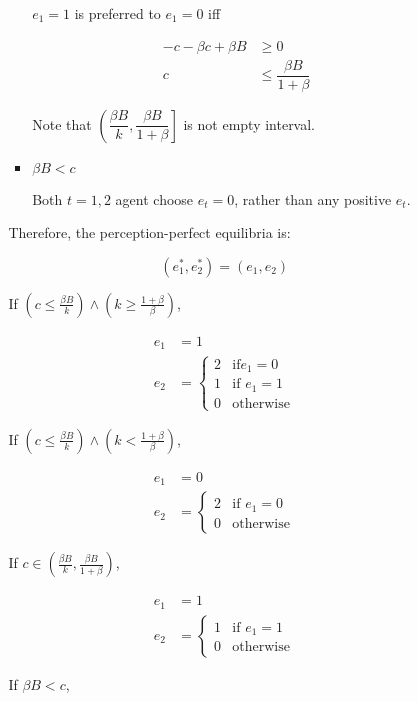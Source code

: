 \documentclass{jsarticle}
\begin{document}
\begin{enumerate}
\begin{enumerate}
\begin{itemize}
\begin{itemize}
$e_1=1$ is preferred to $e_1=0$ iff

\begin{align*}
-c - \beta c + \beta B &\geq 0 \\
c & \leq \dfrac{\beta B}{1+\beta}
\end{align*}

Note that $\left( \dfrac{\beta B}{k}, \dfrac{\beta B}{1+\beta} \right]$ is not empty interval.

\item $\beta B < c$

Both $t=1,2$ agent choose $e_t=0$, rather than any positive $e_t$.

\end{itemize}

\newpage

Therefore, the perception-perfect equilibria is:

\[(e_1^*, e_2^*)=(e_1,e_2) \]

If $(c \leq \frac{\beta B}{k}) \wedge (k \geq \frac{1+\beta}{\beta})$,

\begin{align*}
e_1 &=1 \\
e_2 &=\begin{cases}
2 & \text{if} e_1=0 \\
1 & \text{if } e_1=1 \\
0 & \text{otherwise}
\end{cases}
\end{align*}

If $(c \leq \frac{\beta B}{k}) \wedge (k < \frac{1+\beta}{\beta})$, 

\begin{align*}
e_1 &=0 \\
e_2 &=\begin{cases}
2 & \text{if } e_1=0 \\
0 & \text{otherwise}
\end{cases}
\end{align*}

If $c \in (\frac{\beta B}{k}, \frac{\beta B}{1+\beta})$,

\begin{align*}
e_1 &=1 \\
e_2 &=\begin{cases}
1 & \text{if } e_1=1 \\
0 & \text{otherwise}
\end{cases}
\end{align*}

If $\beta B < c$,


\end{itemize}
\end{enumerate}
\end{enumerate}
\end{document}
